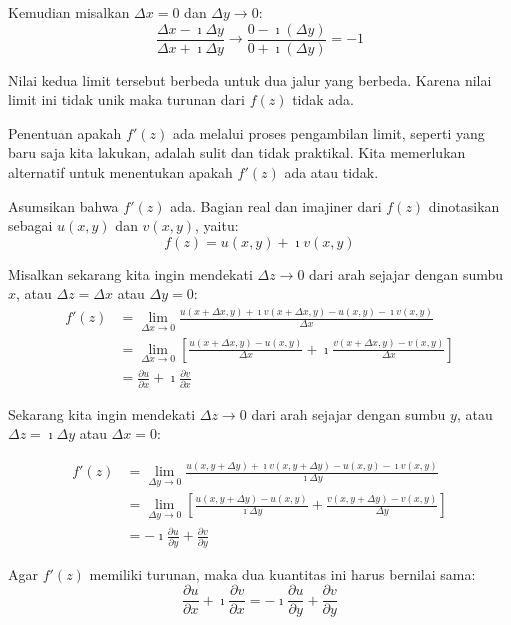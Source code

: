 Kemudian misalkan $\Delta x=0$ dan $\Delta y\rightarrow0$:
\begin{equation*}
\frac{\Delta x-\imath\Delta y}{\Delta x+\imath\Delta y}\rightarrow\frac{0-\imath(\Delta y)}{0+\imath(\Delta y)}=-1
\end{equation*}

Nilai kedua limit tersebut berbeda untuk dua jalur yang berbeda. Karena
nilai limit ini tidak unik maka turunan dari $f(z)$ tidak ada.

Penentuan apakah $f'(z)$ ada melalui proses pengambilan limit, seperti
yang baru saja kita lakukan, adalah sulit dan tidak praktikal. Kita
memerlukan alternatif untuk menentukan apakah $f'(z)$ ada atau tidak.

Asumsikan bahwa $f'(z)$ ada. Bagian real dan imajiner dari $f(z)$
dinotasikan sebagai $u(x,y)$ dan $v(x,y)$, yaitu:
\begin{equation*}
f(z)=u(x,y)+\imath v(x,y)
\end{equation*}

Misalkan sekarang kita ingin mendekati $\Delta z\rightarrow0$ dari
arah sejajar dengan sumbu $x$, atau $\Delta z=\Delta x$ atau $\Delta y=0$:
\begin{align*}
f'(z) & =\lim_{\Delta x\rightarrow0}\frac{u(x+\Delta x,y) + \imath v(x+\Delta x,y)-u(x,y)-\imath v(x,y)}{\Delta x}\\
 & =\lim_{\Delta x\rightarrow0}\left[\frac{u(x+\Delta x,y)-u(x,y)}{\Delta x}+\imath\frac{v(x+\Delta x,y)-v(x,y)}{\Delta x}\right]\\
 & =\frac{\partial u}{\partial x}+\imath\frac{\partial v}{\partial x}
\end{align*}

Sekarang kita ingin mendekati $\Delta z\rightarrow0$ dari arah sejajar
dengan sumbu $y$, atau $\Delta z=\imath\Delta y$ atau $\Delta x=0$:

\begin{align*}
f'(z) & =\lim_{\Delta y\rightarrow0}\frac{u(x,y+\Delta y)+\imath v(x,y+\Delta y)-u(x,y)-\imath v(x,y)}{\imath\Delta y}\\
 & =\lim_{\Delta y\rightarrow0}\left[\frac{u(x,y+\Delta y)-u(x,y)}{\imath\Delta y}+\frac{v(x,y+\Delta y)-v(x,y)}{\Delta y}\right]\\
 & =-\imath\frac{\partial u}{\partial y}+\frac{\partial v}{\partial y}
\end{align*}

Agar $f'(z)$ memiliki turunan, maka dua kuantitas ini harus bernilai sama:
\begin{equation*}
\frac{\partial u}{\partial x}+\imath\frac{\partial v}{\partial x} = 
-\imath\frac{\partial u}{\partial y}+\frac{\partial v}{\partial y}
\end{equation*}


